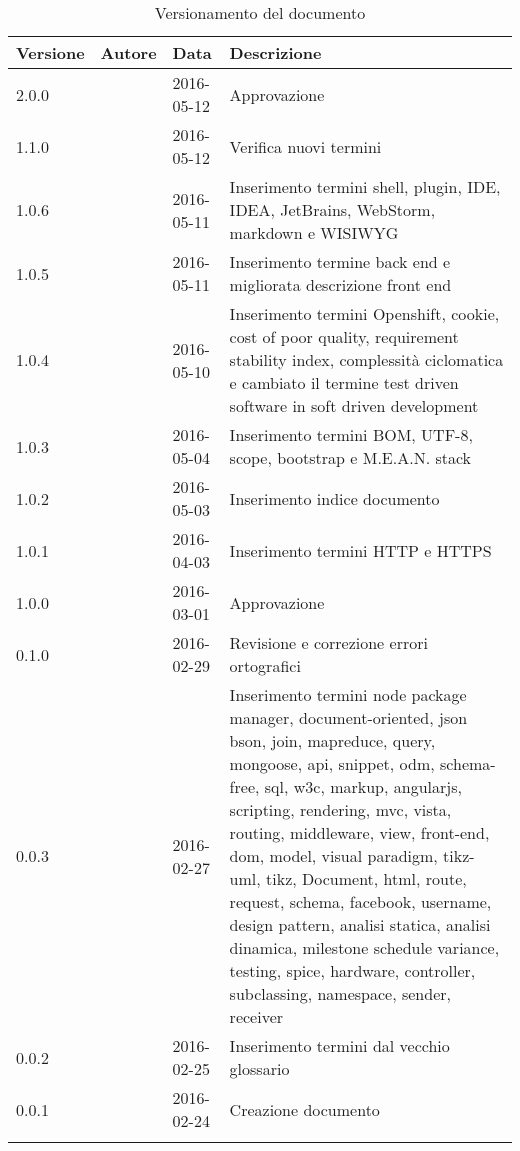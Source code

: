 \documentclass[12pt,a4paper]{article}
\begin{document}
\begin{center}
	\begin{longtable}[H]{p{} p{} p{} p{}}
		\toprule
		\textbf{Versione}	&	\textbf{Autore}	&	\textbf{Data}	&	\textbf{Descrizione}\\*
		\midrule
		\midrule
		2.0.0 & \WS & 2016-05-12 & Approvazione \\*
		\midrule
		1.1.0 & \NDC & 2016-05-12 & Verifica nuovi termini \\*
		\midrule
		1.0.6 & \WS & 2016-05-11  & Inserimento termini shell, plugin, IDE, IDEA, JetBrains, WebStorm, markdown e WISIWYG\\*
		\midrule
		1.0.5 & \TP{} & 2016-05-11 & Inserimento termine back end e migliorata descrizione front end \\*
		\midrule
		1.0.4 & \WS & 2016-05-10 & Inserimento termini Openshift, cookie, cost of poor quality, requirement stability index, complessità ciclomatica e cambiato il termine test driven software in soft driven development\\*
		\midrule
		1.0.3 & \WS & 2016-05-04  & Inserimento termini BOM, UTF-8, scope, bootstrap e M.E.A.N. stack \\*
		\midrule
		1.0.2 & \WS & 2016-05-03  & Inserimento indice documento \\*
		\midrule
		1.0.1 & \TP & 2016-04-03  & Inserimento termini HTTP e HTTPS \\*
		\midrule
		1.0.0 & \TP & 2016-03-01  & Approvazione \\*
		\midrule
		0.1.0 & \NDC & 2016-02-29 & Revisione e correzione errori ortografici \\*
		\midrule
		0.0.3 & \AB & 2016-02-27  & Inserimento termini node package manager, document-oriented, json
		bson, join, mapreduce, query, mongoose, api, snippet, odm, schema-free, sql, w3c, markup, angularjs, scripting, rendering, mvc,  vista, routing, middleware, view, front-end, dom, model, visual paradigm, tikz-uml, tikz, Document, html, route, request, schema, facebook, username, design pattern, analisi statica, analisi dinamica, milestone schedule variance,  testing, spice, hardware, controller, subclassing, namespace, sender, receiver \\*
		\midrule
		0.0.2 & \WS & 2016-02-25  & Inserimento termini dal vecchio glossario \\*
		\midrule
		0.0.1 & \WS & 2016-02-24  & Creazione documento \\*
		\bottomrule
		\caption{Versionamento del documento}
		\label{tabVers1}
	\end{longtable}
\end{center}
\end{document}
